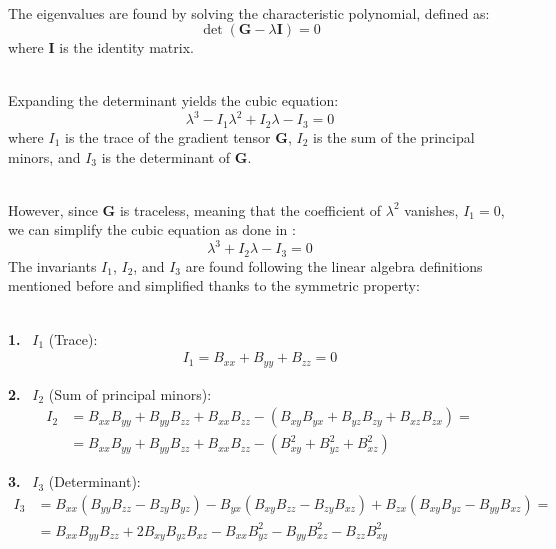 \documentclass[main]{subfiles}
\begin{document}
\noindent\\
The eigenvalues are found by solving the characteristic polynomial, defined as:
\begin{equation}
\det(\mathbf{G} - \lambda \mathbf{I}) = 0
\label{eq:characteristic}
\end{equation}
where \( \mathbf{I} \) is the identity matrix.

\noindent\\
Expanding the determinant yields the cubic equation:
\begin{equation}
\lambda^3 - I_1 \lambda^2 + I_2 \lambda - I_3 = 0
\end{equation}
where \( I_1 \) is the trace of the gradient tensor \( \mathbf{G} \), 
\( I_2 \) is the sum of the principal minors, 
and \( I_3 \) is the determinant of \( \mathbf{G} \). 

\noindent\\
However, since \( \mathbf{G} \) is traceless, meaning that the coefficient 
of \( \lambda^2 \) vanishes, \( I_1 = 0 \), we can simplify the cubic equation as done in
\cite{NSS_single_different_dimensions}:
\begin{equation}
\lambda^3 + I_2 \lambda - I_3 = 0
\end{equation}
The invariants \( I_1 \), \( I_2 \), and \( I_3 \) are found
following the linear algebra definitions mentioned before and simplified thanks to the symmetric property:

\noindent\\
\textbf{1.} \, \( I_1 \) (Trace):
\begin{align*}
 I_1 = B_{xx} + B_{yy} + B_{zz} = 0
\end{align*}

\noindent
\textbf{2.} \, \( I_2 \) (Sum of principal minors):
\begin{align*}
 I_2 &= B_{xx}B_{yy} + B_{yy}B_{zz} + B_{xx}B_{zz} 
 - (B_{xy}B_{yx} + B_{yz}B_{zy} + B_{xz}B_{zx}) = \\
        &= B_{xx}B_{yy} + B_{yy}B_{zz} + B_{xx}B_{zz} 
 - (B_{xy}^2 + B_{yz}^2 + B_{xz}^2)
\end{align*}

\noindent
\textbf{3.} \, \( I_3 \) (Determinant):
\begin{align*}
 I_3 &= B_{xx} (B_{yy} B_{zz} - B_{zy} B_{yz}) 
 - B_{yx} (B_{xy} B_{zz} - B_{zy} B_{xz}) 
 + B_{zx} (B_{xy} B_{yz} - B_{yy} B_{xz}) = \\
        &= B_{xx}B_{yy}B_{zz} + 2B_{xy}B_{yz}B_{xz} - 
 B_{xx}B_{yz}^2 - B_{yy}B_{xz}^2 - B_{zz}B_{xy}^2
\end{align*}
\end{document}
